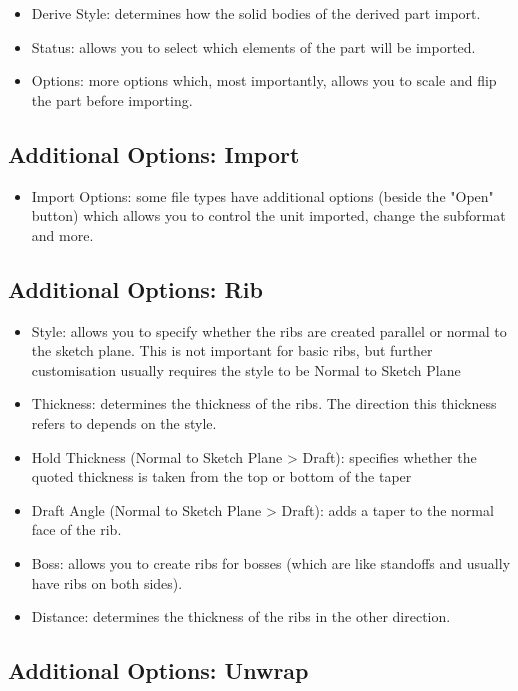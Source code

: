 \begin{itemize}
\item Derive Style: determines how the solid bodies of the derived part import.
\item Status: allows you to select which elements of the part will be imported.
\item Options: more options which, most importantly, allows you to scale and flip the part before importing.
\end{itemize}

\subsection{Additional Options: Import}

\begin{itemize}
\item Import Options: some file types have additional options (beside the "Open" button) which allows you to control the unit imported, change the subformat and more.
\end{itemize}

\subsection{Additional Options: Rib}

\begin{itemize}
\item Style: allows you to specify whether the ribs are created parallel or normal to the sketch plane. This is not important for basic ribs, but further customisation usually requires the style to be Normal to Sketch Plane
\item Thickness: determines the thickness of the ribs. The direction this thickness refers to depends on the style.
\item Hold Thickness (Normal to Sketch Plane > Draft): specifies whether the quoted thickness is taken from the top or bottom of the taper
\item Draft Angle (Normal to Sketch Plane > Draft): adds a taper to the normal face of the rib.
\item Boss: allows you to create ribs for bosses (which are like standoffs and usually have ribs on both sides).
\item Distance: determines the thickness of the ribs in the other direction. 
\end{itemize}

\subsection{Additional Options: Unwrap}

